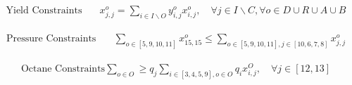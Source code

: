 \documentclass[11pt]{article}
\begin{document}
\begin{align*}
  \text{Yield Constraints} & \quad x_{j,j}^o = \sum_{i \in I \backslash O }y_{i,j}^o x_{i,j}^o, \quad \forall j \in I \backslash C, \forall o \in D \cup R \cup A \cup B  
\end{align*}

\begin{align*}
  \text{Pressure Constraints} & \quad \sum_{o \in [5, 9,10,11]} x_{15,15}^o \leq \sum_{o \in [5, 9,10,11], j \in [10, 6,7,8]} x_{j,j}^o
\end{align*}

\begin{align*}
  \text{Octane Constraints} \sum_{o\in O} \geq q_j \sum_{i \in [3,4,5, 9], o \in O} q_i x_{i,j}^O, \quad \forall j \in [12,13]
\end{align*}
\end{document}
